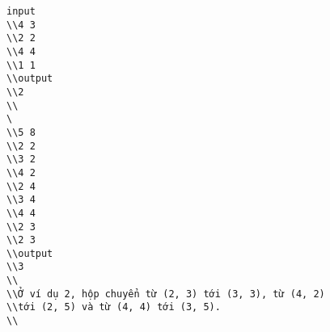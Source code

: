 \begin{verbatim}
input
\\4 3
\\2 2
\\4 4
\\1 1
\\output
\\2
\\
\
\\5 8
\\2 2
\\3 2
\\4 2
\\2 4
\\3 4
\\4 4
\\2 3
\\2 3
\\output
\\3
\\
\\Ở ví dụ 2, hộp chuyển từ (2, 3) tới (3, 3), từ (4, 2)
\\tới (2, 5) và từ (4, 4) tới (3, 5).
\\\end{verbatim}